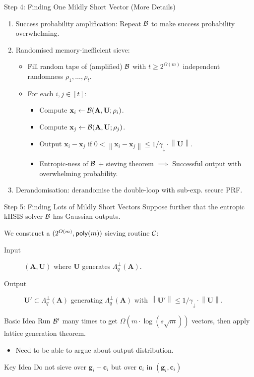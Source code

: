 \documentclass[xcolor=table,10pt,aspectratio=169]{beamer}
\renewcommand{\vec}[1]{\ensuremath{\mathbf{#1}}\xspace}
\newcommand{\norm}[1]{\left\lVert#1\right\rVert}
\providecommand{\mat}[1]{\ensuremath{\vec{#1}}\xspace}
\newcommand{\shrinkfactor}{\gamma_{\downarrow}}
\begin{document}
\begin{frame}[label={sec:org71fdc8a}]{Step 4: Finding One Mildly Short Vector (More Details)}
\begin{enumerate}
\item Success probability amplification: Repeat \(\mathcal{B}\) to make success probability overwhelming.
\item Randomised memory-inefficient sieve:
\begin{itemize}
\item Fill random tape of (amplified) \(\mathcal{B}\) with \(t \geq 2^{\Omega(m)}\) independent randomness \(\rho_1, \ldots, \rho_t\).
\item For each \(i,j \in [t]\):
\begin{itemize}
\item Compute \(\vec{x}_i \gets \bdv(\mat{A}, \mat{U}; \rho_i)\).
\item Compute \(\vec{x}_j \gets \bdv(\mat{A}, \mat{U}; \rho_j)\).
\item Output \(\vec{x}_i - \vec{x}_j\) if \(0 < \norm{\vec{x}_i - \vec{x}_j} \leq 1/\shrinkfactor \cdot \norm{\mat{U}}.\)
\item Entropic-ness of \(\mathcal{B}\) + sieving theorem \(\implies\) Successful output with overwhelming probability.
\end{itemize}
\end{itemize}
\item Derandomisation: derandomise the double-loop with sub-exp. secure PRF.
\end{enumerate}
\end{frame}

\begin{frame}[label={sec:org8fb7e10}]{Step 5: Finding Lots of Mildly Short Vectors}
Suppose further that the entropic kHSIS solver \(\mathcal{B}\) has Gaussian outputs.

We construct a \((2^{O(m)}, \poly[m])\) sieving routine \(\mathcal{C}\):

\begin{description}
\item[{Input}] \((\mat{A}, \mat{U})\) where \(\mat{U}\) generates \(\Lambda_q^\bot(\mat{A})\).
\item[{Output}] \(\mat{U}' \subset \Lambda_q^\bot(\mat{A})\) generating \(\Lambda_q^\bot(\mat{A})\) with \(\norm{\mat{U}'} \leq 1/\shrinkfactor \cdot \norm{\mat{U}}\).
\end{description}

\begin{block}{Basic Idea}
Run \(\mathcal{B}'\) many times to get \(\Omega(m \cdot \log(s \sqrt{m}))\) vectors, then apply lattice generation theorem.
\end{block}

\begin{itemize}
\item Need to be able to argue about output distribution.
\end{itemize}

\begin{alertblock}{Key Idea}
Do not sieve over \(\vec{g}_{i} - \vec{c}_{i}\) but over \(\vec{c}_{i}\) in \((\vec{g}_{i}, \vec{c}_{i})\)
\end{alertblock}
\end{frame}
\end{document}

